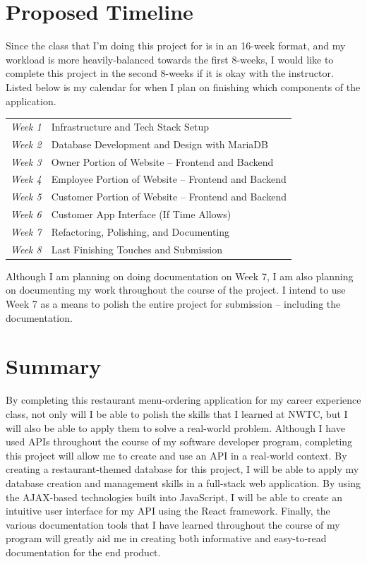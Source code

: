 \documentclass[letterpaper,11pt]{../templates/texMemo}
\newenvironment{notebox}
{\begin{tcolorbox}[colback=blue!5!white,colframe=blue!75!black,title={\faIcon{info-circle}\hspace{2.5mm}\textbf{Note:}}]}
{\end{tcolorbox}}
\begin{document}
    \section{Proposed Timeline}
    Since the class that I'm doing this project for is in an 16-week format, and my workload is more heavily-balanced towards the first 8-weeks, I would like to complete this project in the second 8-weeks if it is okay with the instructor. Listed below is my calendar for when I plan on finishing which components of the application.

    \begin{tabular}{r l}
        \emph{Week 1} & Infrastructure and Tech Stack Setup                 \\
        \emph{Week 2} & Database Development and Design with MariaDB        \\
        \emph{Week 3} & Owner Portion of Website -- Frontend and Backend    \\
        \emph{Week 4} & Employee Portion of Website -- Frontend and Backend \\
        \emph{Week 5} & Customer Portion of Website -- Frontend and Backend \\
        \emph{Week 6} & Customer App Interface (If Time Allows)             \\
        \emph{Week 7} & Refactoring, Polishing, and Documenting             \\
        \emph{Week 8} & Last Finishing Touches and Submission               \\
    \end{tabular}

    \begin{notebox}
        Although I am planning on doing documentation on Week 7, I am also planning on documenting my work throughout the course of the project. I intend to use Week 7 as a means to polish the entire project for submission -- including the documentation.
    \end{notebox}


    \section{Summary}
    By completing this restaurant menu-ordering application for my career experience class, not only will I be able to polish the skills that I learned at NWTC, but I will also be able to apply them to solve a real-world problem. Although I have used APIs throughout the course of my software developer program, completing this project will allow me to create and use an API in a real-world context. By creating a restaurant-themed database for this project, I will be able to apply my database creation and management skills in a full-stack web application. By using the AJAX-based technologies built into JavaScript, I will be able to create an intuitive user interface for my API using the React framework. Finally, the various documentation tools that I have learned throughout the course of my program will greatly aid me in creating both informative and easy-to-read documentation for the end product.
\end{document}
